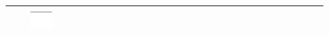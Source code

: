 \documentclass[10pt]{article}
\begin{document}
\begin{center}
\begin{tabular}{|c|c|c|c|c|c|c|c|c|c|c|c|c|c|c|c|c|c|c|c|c|c|c|c|c|c|c|c|c|c|}
 &  & \includegraphics[max width=\textwidth]{2024_11_21_e15da647cf0a41077ac3g-10}
 &  &  \\
\hline

\end{tabular}
\end{center}
\end{document}

